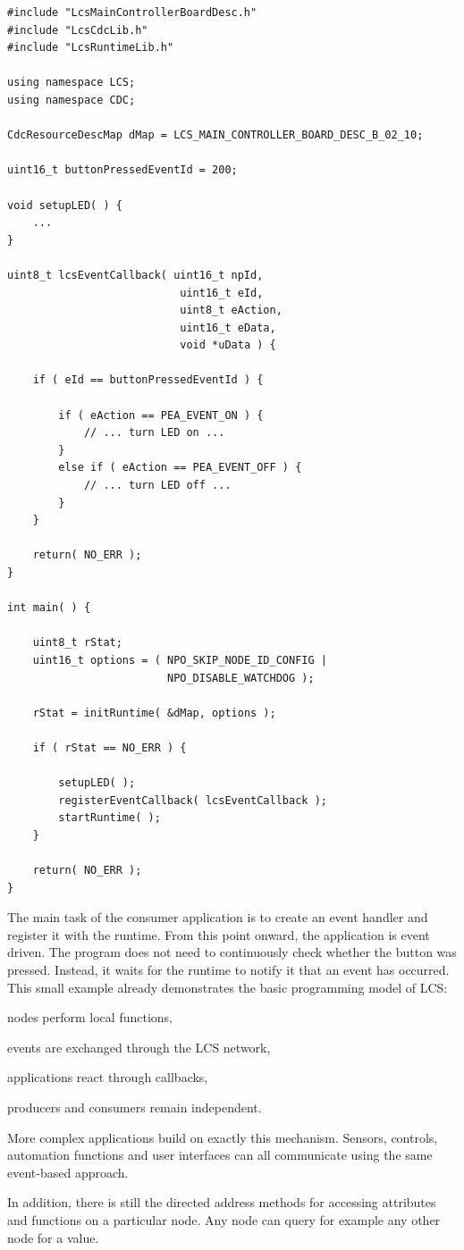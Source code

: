 \begin{lstlisting}[style=codesnippetstyle]
#include "LcsMainControllerBoardDesc.h"
#include "LcsCdcLib.h"
#include "LcsRuntimeLib.h"

using namespace LCS;
using namespace CDC;

CdcResourceDescMap dMap = LCS_MAIN_CONTROLLER_BOARD_DESC_B_02_10;

uint16_t buttonPressedEventId = 200;

void setupLED( ) {
    ...
}

uint8_t lcsEventCallback( uint16_t npId,
                           uint16_t eId,
                           uint8_t eAction,
                           uint16_t eData,
                           void *uData ) {

    if ( eId == buttonPressedEventId ) {

        if ( eAction == PEA_EVENT_ON ) {
            // ... turn LED on ...
        }
        else if ( eAction == PEA_EVENT_OFF ) {
            // ... turn LED off ...
        }
    }

    return( NO_ERR );
}

int main( ) {

    uint8_t rStat;
    uint16_t options = ( NPO_SKIP_NODE_ID_CONFIG |
                         NPO_DISABLE_WATCHDOG );
                     
    rStat = initRuntime( &dMap, options );

    if ( rStat == NO_ERR ) {

        setupLED( );
        registerEventCallback( lcsEventCallback );
        startRuntime( );
    }

    return( NO_ERR );
}
\end{lstlisting}

The main task of the consumer application is to create an event handler and
register it with the runtime.
From this point onward, the application is event driven. The program does not
need to continuously check whether the button was pressed. Instead, it waits for
the runtime to notify it that an event has occurred.
This small example already demonstrates the basic programming model of LCS:

\begin{smallGapItemize}
\item nodes perform local functions,
\item events are exchanged through the LCS network,
\item applications react through callbacks,
\item producers and consumers remain independent.
\end{smallGapItemize}

More complex applications build on exactly this mechanism. Sensors, controls,
automation functions and user interfaces can all communicate using the same
event-based approach.

In addition, there is still the directed address methods for accessing attributes 
and functions on a particular node. Any node can query for example any other 
node for a value. 


